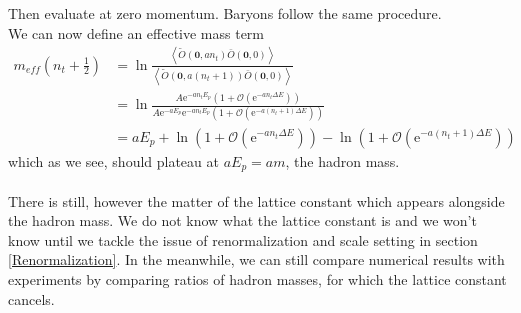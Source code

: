 \documentclass[a4paper,10pt]{article}
\begin{document}
Then evaluate at zero momentum. Baryons follow the same procedure.\\We can now define an effective mass term
\begin{equation}
\begin{aligned} 
m_{eff}(n_t+\frac{1}{2}) &= \operatorname{ln}\frac{\left\langle\widetilde{O}\left(\mathbf{0}, an_{t}\right) \bar{O}(\mathbf{0}, 0)\right\rangle}{\left\langle\widetilde{O}\left(\mathbf{0}, a(n_{t}+1)\right) \bar{O}(\mathbf{0}, 0)\right\rangle}\\ &= \operatorname{ln}\frac{A \mathrm{e}^{-a n_{t} E_p}\left(1+\mathcal{O}\left(\mathrm{e}^{-a n_{t} \Delta E}\right)\right)}{A \mathrm{e}^{-aE_p}\mathrm{e}^{-a n_{t} E_p}\left(1+\mathcal{O}\left(\mathrm{e}^{-a (n_{t}+1) \Delta E}\right)\right)}\\&=aE_p+\operatorname{ln} \left(1+\mathcal{O}\left(\mathrm{e}^{-a n_{t} \Delta E}\right)\right)- \operatorname{ln}\left(1+\mathcal{O}\left(\mathrm{e}^{-a (n_{t}+1) \Delta E}\right)\right)
\end{aligned}
\end{equation}
which as we see, should plateau at $aE_p = am$, the hadron mass.\\\\There is still, however the matter of the lattice constant which appears alongside the hadron mass. We do not know what the lattice constant is and we won't know until we tackle the issue of renormalization and scale setting in section \ref{Renormalization}. In the meanwhile, we can still compare numerical results with experiments by comparing ratios of hadron masses, for which the lattice constant cancels.
\end{document}
